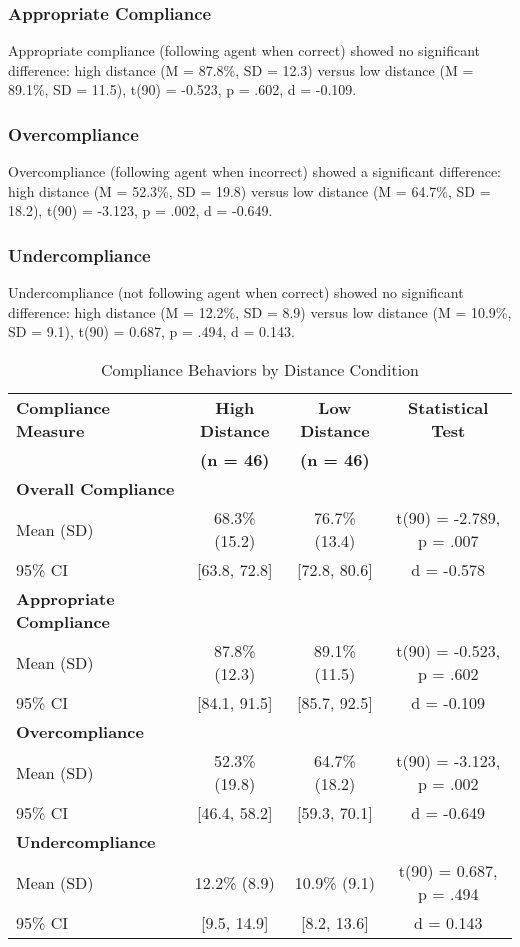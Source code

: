 \documentclass[12pt]{article}
\begin{document}
\subsubsection{Appropriate Compliance}

Appropriate compliance (following agent when correct) showed no significant difference: high distance (M = 87.8\%, SD = 12.3) versus low distance (M = 89.1\%, SD = 11.5), t(90) = -0.523, p = .602, d = -0.109.

\subsubsection{Overcompliance}

Overcompliance (following agent when incorrect) showed a significant difference: high distance (M = 52.3\%, SD = 19.8) versus low distance (M = 64.7\%, SD = 18.2), t(90) = -3.123, p = .002, d = -0.649.

\subsubsection{Undercompliance}

Undercompliance (not following agent when correct) showed no significant difference: high distance (M = 12.2\%, SD = 8.9) versus low distance (M = 10.9\%, SD = 9.1), t(90) = 0.687, p = .494, d = 0.143.

\begin{table}[h]
\centering
\caption{Compliance Behaviors by Distance Condition}
\begin{tabular}{@{}lccc@{}}
\toprule
\textbf{Compliance Measure} & \textbf{High Distance} & \textbf{Low Distance} & \textbf{Statistical Test} \\
& \textbf{(n = 46)} & \textbf{(n = 46)} & \\
\midrule
\textbf{Overall Compliance} & & & \\
Mean (SD) & 68.3\% (15.2) & 76.7\% (13.4) & t(90) = -2.789, p = .007 \\
95\% CI & [63.8, 72.8] & [72.8, 80.6] & d = -0.578 \\
\midrule
\textbf{Appropriate Compliance} & & & \\
Mean (SD) & 87.8\% (12.3) & 89.1\% (11.5) & t(90) = -0.523, p = .602 \\
95\% CI & [84.1, 91.5] & [85.7, 92.5] & d = -0.109 \\
\midrule
\textbf{Overcompliance} & & & \\
Mean (SD) & 52.3\% (19.8) & 64.7\% (18.2) & t(90) = -3.123, p = .002 \\
95\% CI & [46.4, 58.2] & [59.3, 70.1] & d = -0.649 \\
\midrule
\textbf{Undercompliance} & & & \\
Mean (SD) & 12.2\% (8.9) & 10.9\% (9.1) & t(90) = 0.687, p = .494 \\
95\% CI & [9.5, 14.9] & [8.2, 13.6] & d = 0.143 \\
\bottomrule
\end{tabular}
\end{table}
\end{document}
